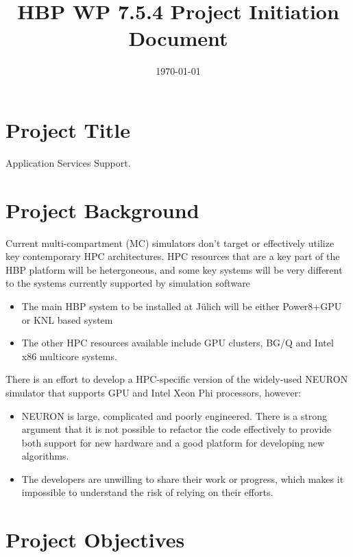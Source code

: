 \documentclass[11pt,a4paper]{article}
\newcommand{\julich}[0]{J\"ulich\xspace}
\begin{document}
\title{HBP WP 7.5.4 Project Initiation Document}
\date{\today}
\maketitle

\section{Project Title}
Application Services Support.

\section{Project Background}

Current multi-compartment (MC) simulators don't target or effectively utilize key contemporary HPC architectures.
HPC resources that are a key part of the HBP platform will be hetergoneous, and some key systems will be very different to the systems currently supported by simulation software
\begin{itemize}
    \item The main HBP system to be installed at \julich will be either Power8+GPU or KNL based system
    \item The other HPC resources available include GPU clusters, BG/Q and Intel x86 multicore systems.
\end{itemize}

There is an effort to develop a HPC-specific version of the widely-used NEURON simulator that supports GPU and Intel Xeon Phi processors, however:
\begin{itemize}
    \item NEURON is large, complicated and poorly engineered. There is a strong argument that it is not possible to refactor the code effectively to provide both support for new hardware and a good platform for developing new algorithms.
    \item The developers are unwilling to share their work or progress, which makes it impossible to understand the risk of relying on their efforts.
\end{itemize}


\section{Project Objectives}
\end{document}
